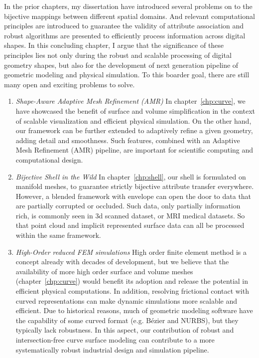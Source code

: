 In the prior chapters, my dissertation have introduced several problems on to the bijective mappings between different spatial domains.
And relevant computational principles are introduced to guarantee the validity of attribute association and robust algorithms are presented to efficiently process information across digital shapes. 
In this concluding chapter, I argue that the significance of these principles lies not only during the robust and scalable processing of digital geometry shapes, but also for the development of next generation pipeline of geometric modeling and physical simulation. 
To this boarder goal, there are still many open and exciting problems to solve.

\begin{enumerate}
  \item \emph{Shape-Aware Adaptive Mesh Refinement (AMR)}
In chapter~\ref{chp:curve}, we have showcased the benefit of surface and volume simplification in the context of scalable visualization and efficient physical simulation. On the other hand, our framework can be further extended to adaptively refine a given geometry, adding detail and smoothness. Such features, combined with an Adaptive Mesh Refinement (AMR) pipeline, are important for scientific computing and computational design.

\item \emph{Bijective Shell in the Wild} %
In chapter~\ref{chp:shell}, our shell is formulated on manifold meshes, 
to guarantee strictly bijective attribute transfer everywhere.
However, a blended framework with envelope \cite{hu2018tetrahedral, Wang:2021} can open the door to  data that are partially corrupted or occluded. Such data, only partially information rich, is commonly seen in 3d scanned dataset, or MRI medical datasets.
So that point cloud and implicit represented surface data can all be processed within the same framework.

\item \emph{High-Order reduced FEM simulations}
High order finite element method is a concept already with decades of development, but we believe that the availability of more high order surface and volume meshes (chapter~\ref{chp:curve}) would benefit its adoption and release the potential in efficient physical computations. In addition, resolving frictional contact with curved representations \cite{ferguson2022high} can make dynamic simulations more scalable and efficient. 
Due to historical reasons, much of geometric modeling software have the capability of some curved format (e.g. B{\'e}zier and NURBS), but they typically lack robustness. In this aspect, our contribution of robust and intersection-free curve surface modeling can contribute to a more systematically robust industrial design and simulation pipeline.


\end{enumerate}
